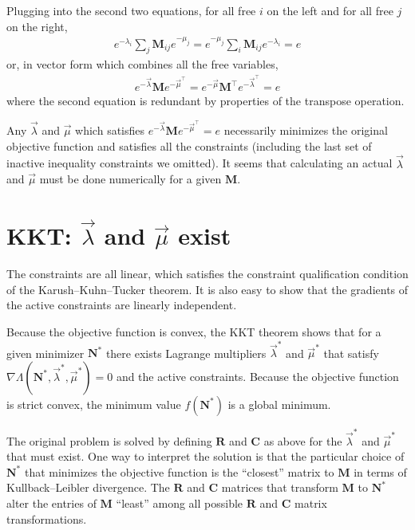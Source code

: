 \documentclass[10pt,a4paper]{article}
\newcommand{\matr}[1]{\mathbf{#1}} %
\newcommand{\tr}[0]{{\intercal}}
\begin{document}
Plugging into the second two equations, for all free $i$ on the left and for all free $j$ on the right,
\begin{align*}
e^{-\lambda_i} \sum_j \matr{M}_{ij} e^{-\mu_j}
= e^{-\mu_j} \sum_i \matr{M}_{ij} e^{-\lambda_i}
= e
\end{align*}
or, in vector form which combines all the free variables,
\begin{align*}
e^{-\vec{\lambda}} \matr{M} e^{-\vec{\mu}^\tr}
= e^{-\vec{\mu}} \matr{M^\tr} e^{-\vec{\lambda}^\tr}
= e
\end{align*}
where the second equation is redundant by properties of the transpose operation.

Any $\vec{\lambda}$ and $\vec{\mu}$ which satisfies $e^{-\vec{\lambda}} \matr{M} e^{-\vec{\mu}^\tr} = e$
necessarily minimizes the original objective function and satisfies all the constraints
(including the last set of inactive inequality constraints we omitted). 
It seems that calculating an actual $\vec{\lambda}$ and $\vec{\mu}$ 
must be done numerically for a given $\matr{M}$.

\section{KKT: $\vec{\lambda}$ and $\vec{\mu}$ exist}
The constraints are all linear, which satisfies the 
constraint qualification condition of the Karush–Kuhn–Tucker theorem.
It is also easy to show that the gradients of the active constraints are linearly independent.

Because the objective function is convex, the KKT theorem shows 
that for a given minimizer $\matr{N}^*$ 
there exists Lagrange multipliers $\vec{\lambda}^*$ and $\vec{\mu}^*$ 
that satisfy  $\nabla \Lambda(\matr{N}^*,\vec{\lambda}^*, \vec{\mu}^*) = 0$
and the active constraints.
Because the objective function is strict convex, the minimum value 
$f(\matr{N}^*)$ is a global minimum.

The original problem is solved by defining $\matr{R}$ and $\matr{C}$ as above
for the $\vec{\lambda}^*$ and $\vec{\mu}^*$ that must exist.
One way to interpret the solution is that the particular choice of $\matr{N}^*$
that minimizes the objective function is the ``closest'' matrix to $\matr{M}$
in terms of Kullback–Leibler divergence.
The $\matr{R}$ and $\matr{C}$ matrices that transform $\matr{M}$ to $\matr{N}^*$
alter the entries of $\matr{M}$ ``least'' among all possible 
$\matr{R}$ and $\matr{C}$ matrix transformations.

%
%
\end{document}
